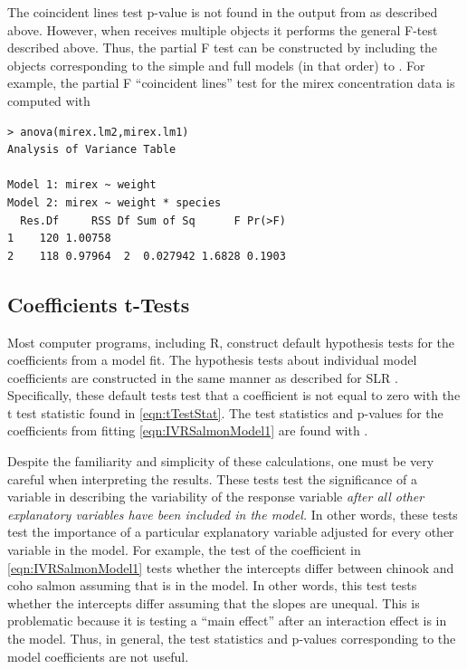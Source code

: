 \documentclass[10pt,openany]{book}\usepackage[]{graphicx}\usepackage[]{color}
\makeatletter
\newenvironment{kframe}{%
 \def\at@end@of@kframe{}%
 \ifinner\ifhmode%
  \def\at@end@of@kframe{\end{minipage}}%
  \begin{minipage}{\columnwidth}%
 \fi\fi%
 \def\FrameCommand##1{\hskip\@totalleftmargin \hskip-\fboxsep
 \colorbox{shadecolor}{##1}\hskip-\fboxsep
     \hskip-\linewidth \hskip-\@totalleftmargin \hskip\columnwidth}%
 \MakeFramed {\advance\hsize-\width
   \@totalleftmargin\z@ \linewidth\hsize
   \@setminipage}}%
 {\par\unskip\endMakeFramed%
 \at@end@of@kframe}
\newenvironment{knitrout}{}{} %
\makeatother
\begin{document}
The coincident lines test p-value is not found in the output from  as described above.  However, when  receives multiple  objects it performs the general F-test described above.  Thus, the partial F test can be constructed by including the  objects corresponding to the simple and full models (in that order) to .  For example, the partial F ``coincident lines'' test for the mirex concentration data is computed with

\begin{knitrout}
\color{fgcolor}\begin{kframe}
\begin{verbatim}
> anova(mirex.lm2,mirex.lm1)
Analysis of Variance Table

Model 1: mirex ~ weight
Model 2: mirex ~ weight * species
  Res.Df     RSS Df Sum of Sq      F Pr(>F)
1    120 1.00758                           
2    118 0.97964  2  0.027942 1.6828 0.1903
\end{verbatim}
\end{kframe}
\end{knitrout}


\subsection{Coefficients t-Tests}
Most computer programs, including R, construct default hypothesis tests for the coefficients from a model fit.  The hypothesis tests about individual model coefficients are constructed in the same manner as described for SLR .  Specifically, these default tests test that a coefficient is not equal to zero with the t test statistic found in \eqref{eqn:tTestStat}.  The test statistics and p-values for the coefficients from fitting \eqref{eqn:IVRSalmonModel1} are found with .


Despite the familiarity and simplicity of these calculations, one must be very careful when interpreting the results.  These tests test the significance of a variable in describing the variability of the response variable \emph{after all other explanatory variables have been included in the model.}  In other words, these tests test the importance of a particular explanatory variable adjusted for every other variable in the model.  For example, the test of the  coefficient in \eqref{eqn:IVRSalmonModel1} tests whether the intercepts differ between chinook and coho salmon assuming that  is in the model.  In other words, this test tests whether the intercepts differ assuming that the slopes are unequal.  This is problematic because it is testing a ``main effect'' after an interaction effect is in the model.  Thus, in general, the test statistics and p-values corresponding to the model coefficients are not useful.
\end{document}
